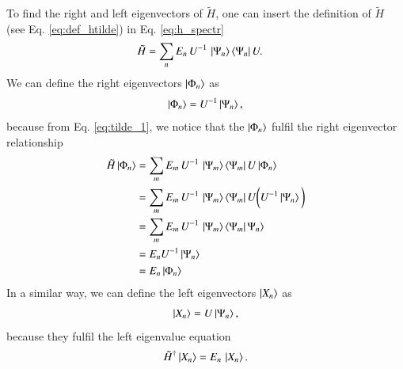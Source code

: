 \documentclass[aip,jcp,reprint,noshowkeys,superscriptaddress]{revtex4-1}
\begin{document}
To find the right and left eigenvectors of $\tilde{H}$, one can insert the definition of $\tilde{H}$ (see Eq. \eqref{eq:def_htilde}) in Eq. \eqref{eq:h_spectr}
\begin{equation}
 \label{eq:tilde_1}
 \begin{aligned}
 \tilde{H} & = \sum_n E_n \, U^{-1} \, \ket{\Psi_n} \bra{\Psi_n}U.
 \end{aligned}
\end{equation}
We can define the right eigenvectors $\ket{\Phi_n}$ as
\begin{equation}
 \label{eq:def_right}
 \ket{\Phi_n} = U^{-1} \ket{\Psi_n},
\end{equation}
 because  from Eq. \eqref{eq:tilde_1}, we notice that the $\ket{\Phi_n}$ fulfil the right eigenvector relationship
\begin{equation}
 \begin{aligned}
 \tilde{H} \ket{\Phi_n} & = \sum_m E_m \,U^{-1} \, \ket{\Psi_m} \bra{\Psi_m} U\ket{\Phi_n} \\
                        & = \sum_m E_m \,U^{-1} \, \ket{\Psi_m} \bra{\Psi_m} U \bigg( U^{-1} \ket{\Psi_n} \bigg) \\
                        & = \sum_m E_m \,U^{-1} \, \ket{\Psi_m} \bra{\Psi_m} \Psi_n \rangle \\
                        & = E_n          U^{-1} \ket{\Psi_n} \\
                        & = E_n  \ket{\Phi_n} \\
 \end{aligned}
\end{equation}
In a similar way, we can define the left eigenvectors $\ket{X_n}$ as 
\begin{equation}
 \label{eq:def_left}
 \ket{X_n} = U \ket{\Psi_n},
\end{equation}
because they fulfil the left eigenvalue equation
\begin{equation}
 \begin{aligned}
 \tilde{H}^{\dagger} \ket{X_n}  = E_n \, \ket{X_n}. 
 \end{aligned}
\end{equation}
\end{document}
